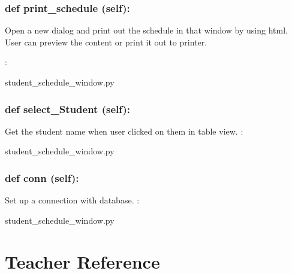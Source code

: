 \hypertarget{class_poly_a14a7ad77ce612b0c54f531d307ee4b39}{
\subsubsection[{def print_schedule (self):}]{\setlength{\rightskip}{0pt plus 5cm}def {print\_schedule} (self):}}\label{class_poly_a14a7ad77ce612b0c54f531d307ee4b39}
Open a new dialog and print out the schedule in that window by using html. User can preview the content or print it out to printer.

:\begin{DoxyCompactItemize}
\item 
student\_schedule\_window.\-py\end{DoxyCompactItemize}

\hypertarget{class_poly_a14a7ad77ce612b0c54f531d307ee4b39}{
\subsubsection[{def select_Student (self):}]{\setlength{\rightskip}{0pt plus 5cm}def {select\_Student} (self):}}\label{class_poly_a14a7ad77ce612b0c54f531d307ee4b39}
Get the student name when user clicked on them in table view.
:\begin{DoxyCompactItemize}
\item 
student\_schedule\_window.\-py\end{DoxyCompactItemize}

\hypertarget{class_poly_a14a7ad77ce612b0c54f531d307ee4b39}{
\subsubsection[{def conn (self):}]{\setlength{\rightskip}{0pt plus 5cm}def {conn} (self):}}\label{class_poly_a14a7ad77ce612b0c54f531d307ee4b39}
Set up a connection with database.
:\begin{DoxyCompactItemize}
\item 
student\_schedule\_window.\-py\end{DoxyCompactItemize}


\hypertarget{Teacher}{\section{Teacher Reference}
\label{Teacher}
}
